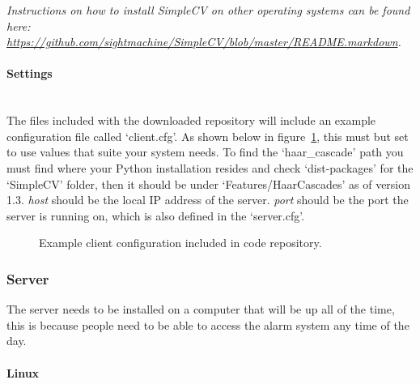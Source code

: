 \documentclass[a4paper]{article}
\begin{document}
        \textit{Instructions on how to install SimpleCV on other operating systems can be found here: \url{https://github.com/sightmachine/SimpleCV/blob/master/README.markdown}.}

        \paragraph{Settings}\mbox{}\\
            The files included with the downloaded repository will include an example configuration file called `client.cfg'. As shown
            below in figure~\ref{lst:clientcfg}, this must but set to use values that suite your system needs. To find the `haar\_cascade'
            path you must find where your Python installation resides and check `dist-packages' for the `SimpleCV' folder, then it should
            be under `Features/HaarCascades' as of version 1.3. \newline
            \textit{host} should be the local IP address of the server. \newline
            \textit{port} should be the port the server is running on, which is also defined in the `server.cfg'.

            \begin{figure}[H]
                \centering
                \caption{Example client configuration included in code repository.}
                \label{lst:clientcfg}
                    
            \end{figure}

    \subsubsection{Server}
        The server needs to be installed on a computer that will be up all of the time, this is because people need to be able to access
        the alarm system any time of the day.

        \paragraph{Linux}
\end{document}
